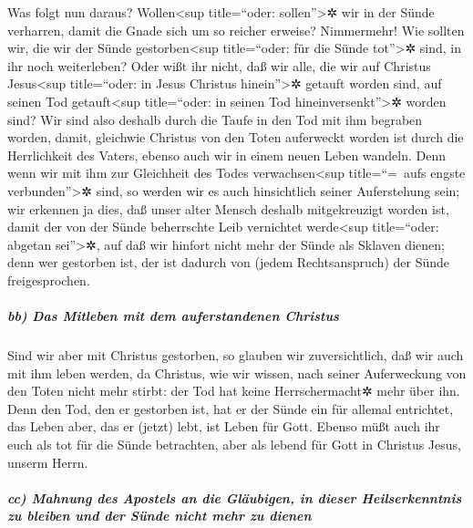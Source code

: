  Was folgt nun daraus? Wollen\textless sup title=``oder:
sollen''\textgreater✲ wir in der Sünde verharren, damit die Gnade sich
um so reicher erweise?  Nimmermehr! Wie sollten wir, die
wir der Sünde gestorben\textless sup title=``oder: für die Sünde
tot''\textgreater✲ sind, in ihr noch weiterleben?  Oder
wißt ihr nicht, daß wir alle, die wir auf Christus Jesus\textless sup
title=``oder: in Jesus Christus hinein''\textgreater✲ getauft worden
sind, auf seinen Tod getauft\textless sup title=``oder: in seinen Tod
hineinversenkt''\textgreater✲ worden sind?  Wir sind also
deshalb durch die Taufe in den Tod mit ihm begraben worden, damit,
gleichwie Christus von den Toten auferweckt worden ist durch die
Herrlichkeit des Vaters, ebenso auch wir in einem neuen Leben wandeln.
 Denn wenn wir mit ihm zur Gleichheit des Todes
verwachsen\textless sup title=``=~aufs engste verbunden''\textgreater✲
sind, so werden wir es auch hinsichtlich seiner Auferstehung sein;
 wir erkennen ja dies, daß unser alter Mensch deshalb
mitgekreuzigt worden ist, damit der von der Sünde beherrschte Leib
vernichtet werde\textless sup title=``oder: abgetan sei''\textgreater✲,
auf daß wir hinfort nicht mehr der Sünde als Sklaven dienen;
 denn wer gestorben ist, der ist dadurch von (jedem
Rechtsanspruch) der Sünde freigesprochen.

\hypertarget{bb-das-mitleben-mit-dem-auferstandenen-christus}{%
\subparagraph{bb) Das Mitleben mit dem auferstandenen
Christus}\label{bb-das-mitleben-mit-dem-auferstandenen-christus}}

 Sind wir aber mit Christus gestorben, so glauben wir
zuversichtlich, daß wir auch mit ihm leben werden,  da
Christus, wie wir wissen, nach seiner Auferweckung von den Toten nicht
mehr stirbt: der Tod hat keine Herrschermacht✲ mehr über ihn.
 Denn den Tod, den er gestorben ist, hat er der Sünde ein
für allemal entrichtet, das Leben aber, das er (jetzt) lebt, ist Leben
für Gott.  Ebenso müßt auch ihr euch als tot für die
Sünde betrachten, aber als lebend für Gott in Christus Jesus, unserm
Herrn.

\hypertarget{cc-mahnung-des-apostels-an-die-gluxe4ubigen-in-dieser-heilserkenntnis-zu-bleiben-und-der-suxfcnde-nicht-mehr-zu-dienen}{%
\subparagraph{cc) Mahnung des Apostels an die Gläubigen, in dieser
Heilserkenntnis zu bleiben und der Sünde nicht mehr zu
dienen}\label{cc-mahnung-des-apostels-an-die-gluxe4ubigen-in-dieser-heilserkenntnis-zu-bleiben-und-der-suxfcnde-nicht-mehr-zu-dienen}}

